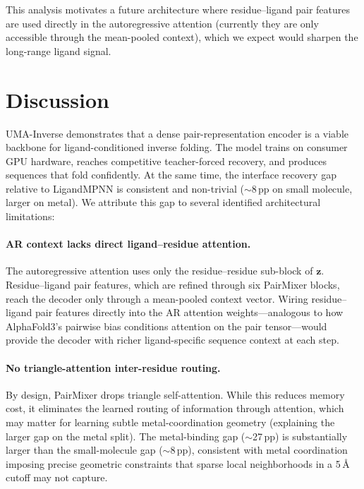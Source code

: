 \documentclass[11pt,letterpaper]{article}
\newcommand{\bz}{\mathbf{z}}
\begin{document}
This analysis motivates a future architecture where residue--ligand pair features are used
directly in the autoregressive attention (currently they are only accessible through the
mean-pooled context), which we expect would sharpen the long-range ligand signal.

\section{Discussion}
\label{sec:discussion}

UMA-Inverse demonstrates that a dense pair-representation encoder is a viable backbone for
ligand-conditioned inverse folding. The model trains on consumer GPU hardware, reaches
competitive teacher-forced recovery, and produces sequences that fold confidently. At the same
time, the interface recovery gap relative to LigandMPNN is consistent and non-trivial (${\sim}$8\,pp
on small molecule, larger on metal). We attribute this gap to several identified architectural
limitations:

\paragraph{AR context lacks direct ligand--residue attention.}
The autoregressive attention uses only the residue--residue sub-block of $\bz$. Residue--ligand
pair features, which are refined through six PairMixer blocks, reach the decoder only through
a mean-pooled context vector. Wiring residue--ligand pair features directly into the AR attention
weights---analogous to how AlphaFold3's pairwise bias conditions attention on the pair
tensor---would provide the decoder with richer ligand-specific sequence context at each step.

\paragraph{No triangle-attention inter-residue routing.}
By design, PairMixer drops triangle self-attention. While this reduces memory cost, it eliminates
the learned routing of information through attention, which may matter for learning subtle
metal-coordination geometry (explaining the larger gap on the metal split). The metal-binding
gap (${\sim}$27\,pp) is substantially larger than the small-molecule gap (${\sim}$8\,pp),
consistent with metal coordination imposing precise geometric constraints that sparse local
neighborhoods in a 5\,{\AA} cutoff may not capture.
\end{document}

